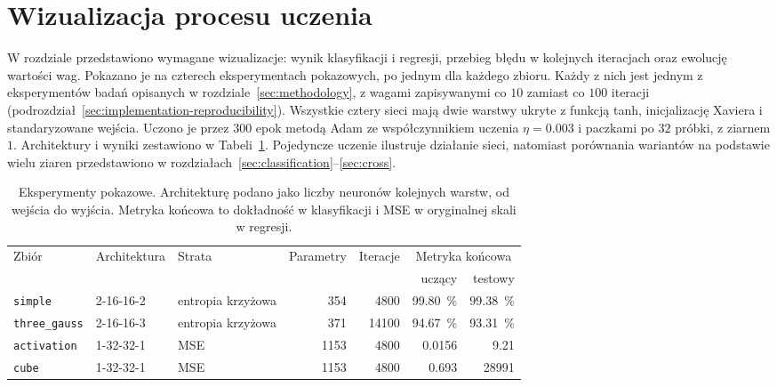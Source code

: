 \section{Wizualizacja procesu uczenia}
\label{sec:showcase}

W rozdziale przedstawiono wymagane wizualizacje: wynik klasyfikacji i regresji, przebieg błędu w kolejnych iteracjach oraz ewolucję wartości wag. Pokazano je na czterech eksperymentach pokazowych, po jednym dla każdego zbioru. Każdy z nich jest jednym z eksperymentów badań opisanych w rozdziale~\ref{sec:methodology}, z wagami zapisywanymi co $10$ zamiast co $100$ iteracji (podrozdział~\ref{sec:implementation-reproducibility}). Wszystkie cztery sieci mają dwie warstwy ukryte z funkcją tanh, inicjalizację Xaviera i standaryzowane wejścia. Uczono je przez $300$ epok metodą Adam ze współczynnikiem uczenia $\eta = \num{0.003}$ i paczkami po $32$ próbki, z ziarnem $1$. Architektury i wyniki zestawiono w Tabeli~\ref{tab:showcase}. Pojedyncze uczenie ilustruje działanie sieci, natomiast porównania wariantów na podstawie wielu ziaren przedstawiono w rozdziałach~\ref{sec:classification}--\ref{sec:cross}.

\begin{table}[H]
    \centering
    \caption{Eksperymenty pokazowe. Architekturę podano jako liczby neuronów kolejnych warstw, od wejścia do wyjścia. Metryka końcowa to dokładność w klasyfikacji i MSE w oryginalnej skali w regresji.}
    \label{tab:showcase}
    \begin{tabular}{lllrrrr}
        \toprule
        Zbiór & Architektura & Strata & Parametry & Iteracje & \multicolumn{2}{c}{Metryka końcowa} \\
        \cmidrule(lr){6-7}
        & & & & & uczący & testowy \\
        \midrule
        \texttt{simple} & 2-16-16-2 & entropia krzyżowa & \num{354} & \num{4800} & \qty{99.80}{\percent} & \qty{99.38}{\percent} \\
        \texttt{three\_gauss} & 2-16-16-3 & entropia krzyżowa & \num{371} & \num{14100} & \qty{94.67}{\percent} & \qty{93.31}{\percent} \\
        \texttt{activation} & 1-32-32-1 & MSE & \num{1153} & \num{4800} & \num{0.0156} & \num{9.21} \\
        \texttt{cube} & 1-32-32-1 & MSE & \num{1153} & \num{4800} & \num{0.693} & \num{28991} \\
        \bottomrule
    \end{tabular}
\end{table}

